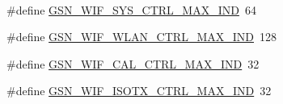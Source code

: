 \paragraph*{}
\begin{DoxyCompactItemize}
\item 
\#define \hyperlink{a00608_abe13302e016e67142230d1bf7bdb48cf}{GSN\_\-WIF\_\-SYS\_\-CTRL\_\-MAX\_\-IND}~64
\item 
\#define \hyperlink{a00608_a692ce45c7b1608292f5ca78251f12d85}{GSN\_\-WIF\_\-WLAN\_\-CTRL\_\-MAX\_\-IND}~128
\item 
\#define \hyperlink{a00608_a07a5b5cf683f42ec8377572f71520ecb}{GSN\_\-WIF\_\-CAL\_\-CTRL\_\-MAX\_\-IND}~32
\item 
\#define \hyperlink{a00608_acc835c7a1353690ebd624e7223d55a39}{GSN\_\-WIF\_\-ISOTX\_\-CTRL\_\-MAX\_\-IND}~32
\end{DoxyCompactItemize}

